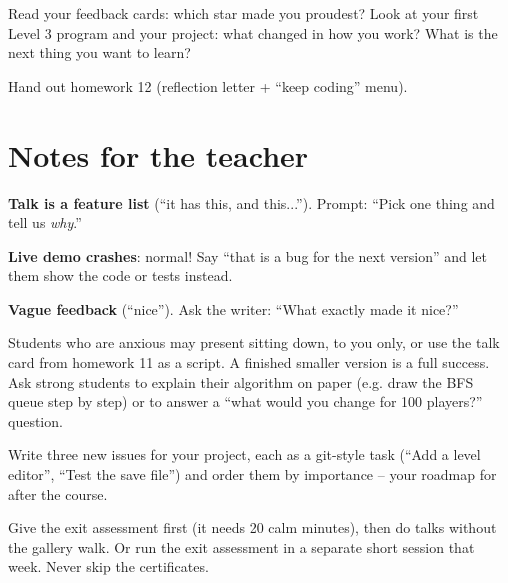 \begin{reflection}
Read your feedback cards: which star made you proudest? Look at your first Level 3 program and your project: what changed in how you work? What is the next thing you want to learn?
\end{reflection}

Hand out homework 12 (reflection letter + \enquote{keep coding} menu).

\section{Notes for the teacher}
\begin{commonmistakes}
  \item \textbf{Talk is a feature list} (\enquote{it has this, and this...}). Prompt: \enquote{Pick one thing and tell us \emph{why}.}
  \item \textbf{Live demo crashes}: normal! Say \enquote{that is a bug for the next version} and let them show the code or tests instead.
  \item \textbf{Vague feedback} (\enquote{nice}). Ask the writer: \enquote{What exactly made it nice?}
\end{commonmistakes}

\begin{differentiation}
\supportpath Students who are anxious may present sitting down, to you only, or use the talk card from homework 11 as a script. A finished smaller version is a full success.
\extensionpath Ask strong students to explain their algorithm on paper (e.g. draw the BFS queue step by step) or to answer a \enquote{what would you change for 100 players?} question.
\end{differentiation}

\begin{stretchchallenge}
Write three new issues for your project, each as a git-style task (\enquote{Add a level editor}, \enquote{Test the save file}) and order them by importance -- your roadmap for after the course.
\end{stretchchallenge}

\begin{teachernote}
Give the exit assessment first (it needs 20 calm minutes), then do talks without the gallery walk. Or run the exit assessment in a separate short session that week. Never skip the certificates.
\end{teachernote}
